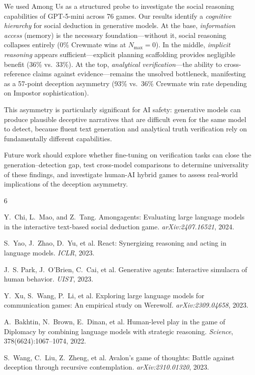 \documentclass{article}
\begin{document}
We used Among Us as a structured probe to investigate the social reasoning capabilities of GPT-5-mini across 76 games. Our results identify a \emph{cognitive hierarchy} for social deduction in generative models. At the base, \emph{information access} (memory) is the necessary foundation---without it, social reasoning collapses entirely (0\% Crewmate wins at $N_{\max}=0$). In the middle, \emph{implicit reasoning} appears sufficient---explicit planning scaffolding provides negligible benefit (36\% vs.\ 33\%). At the top, \emph{analytical verification}---the ability to cross-reference claims against evidence---remains the unsolved bottleneck, manifesting as a 57-point deception asymmetry (93\% vs.\ 36\% Crewmate win rate depending on Impostor sophistication).

This asymmetry is particularly significant for AI safety: generative models can produce plausible deceptive narratives that are difficult even for the same model to detect, because fluent text generation and analytical truth verification rely on fundamentally different capabilities.

Future work should explore whether fine-tuning on verification tasks can close the generation--detection gap, test cross-model comparisons to determine universality of these findings, and investigate human-AI hybrid games to assess real-world implications of the deception asymmetry.



\begin{thebibliography}{6}

Y.~Chi, L.~Mao, and Z.~Tang.
\newblock Amongagents: Evaluating large language models in the interactive text-based social deduction game.
\newblock \emph{arXiv:2407.16521}, 2024.

S.~Yao, J.~Zhao, D.~Yu, et al.
\newblock React: Synergizing reasoning and acting in language models.
\newblock \emph{ICLR}, 2023.

J.~S. Park, J.~O'Brien, C.~Cai, et al.
\newblock Generative agents: Interactive simulacra of human behavior.
\newblock \emph{UIST}, 2023.

Y.~Xu, S.~Wang, P.~Li, et al.
\newblock Exploring large language models for communication games: An empirical study on Werewolf.
\newblock \emph{arXiv:2309.04658}, 2023.

A.~Bakhtin, N.~Brown, E.~Dinan, et al.
\newblock Human-level play in the game of Diplomacy by combining language models with strategic reasoning.
\newblock \emph{Science}, 378(6624):1067--1074, 2022.

S.~Wang, C.~Liu, Z.~Zheng, et al.
\newblock Avalon's game of thoughts: Battle against deception through recursive contemplation.
\newblock \emph{arXiv:2310.01320}, 2023.

\end{thebibliography}
\end{document}
